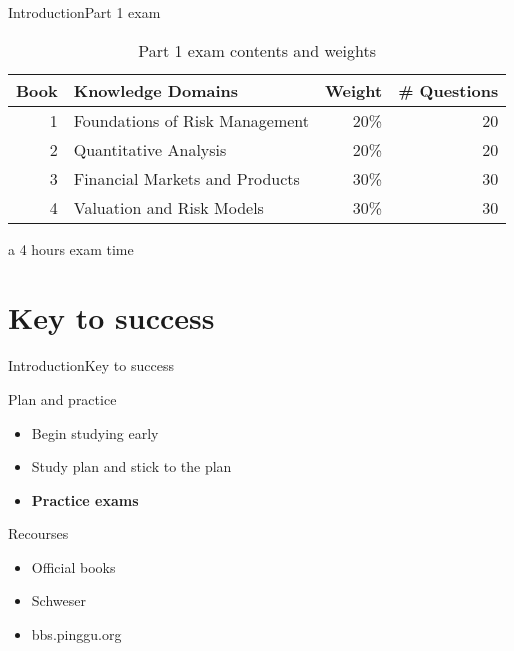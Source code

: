 \begin{frame}{Introduction}{Part 1 exam}
\begin{table}
\centering
\caption{Part 1 exam contents and weights}
\begin{threeparttable}[htbp]
	\begin{tabular}{||r|l|r|r||}
		\hline
		\hline
		\multicolumn{1}{||l|}{Book} & Knowledge Domains & \multicolumn{1}{l|}{Weight} & \multicolumn{1}{l||}{\# Questions} \bigstrut\\
		\hline
		1     & Foundations of Risk Management & 20\%  & 20 \bigstrut\\
		\hline
		2     & Quantitative Analysis & 20\%  & 20 \bigstrut\\
		\hline
		3     & Financial Markets and Products & 30\%  & 30 \bigstrut\\
		\hline
		4     & Valuation and Risk Models & 30\%  & 30 \bigstrut\\
		\hline
		\hline
	\end{tabular}
	\begin{tablenotes}
		\item [a] 4 hours exam time 
	\end{tablenotes}
\end{threeparttable}
\label{tab:weights}
\end{table}
\end{frame}

\section{Key to success}
\begin{frame}{Introduction}{Key to success}
\begin{block}{Plan and practice}
\begin{itemize}
\item Begin studying early
\item Study plan and stick to the plan
\item \textbf{Practice exams}
\end{itemize}
\end{block}

\begin{block}{Recourses}
\begin{itemize}
\item Official books
\item Schweser 
\item bbs.pinggu.org
\end{itemize}
\end{block}
\end{frame}

